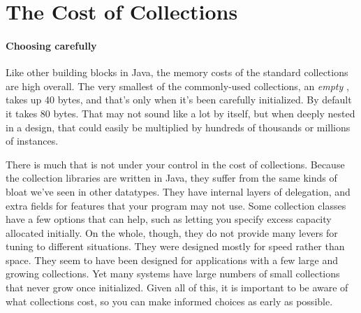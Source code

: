 \begin{description}

\end{description}


\section{The Cost of Collections}
\label{sec:designing-with-collections}

\paragraph{Choosing carefully}Like other
building blocks in Java, the memory costs of the standard collections are high overall. 
The very smallest of the commonly-used collections, an \emph{empty}
, takes up 40 bytes, and that's only when it's been carefully
initialized. By default it takes 80 bytes. That may not sound like a lot by
itself, but when deeply nested in a design, that could easily be multiplied
by hundreds of thousands or millions of instances.  

There is much that is not under your control in the cost
of collections.
Because the collection libraries are written in Java, they suffer
from the same kinds of bloat we've seen in other datatypes. They have
internal layers of delegation, and extra fields for features that your program
may not use. Some
collection classes have a few options that can help, such as
letting you specify excess capacity allocated initially. On the
whole, though, they do not provide many levers for tuning to different situations. They were
designed mostly for speed rather than space. They seem to have been designed
for applications with a few large and growing collections. Yet many systems have large numbers
of small collections that never grow once initialized. Given all of this, it is important
to be aware of what collections cost, so you can make informed choices as early as possible. 

